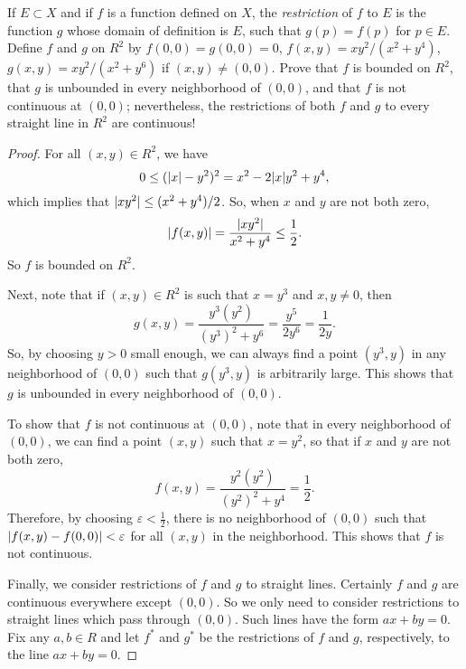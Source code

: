  If $E\subset X$ and if $f$ is a function defined on $X$,
the {\em restriction} of $f$ to $E$ is the function $g$ whose domain
of definition is $E$, such that $g(p) = f(p)$ for $p\in E$. Define $f$
and $g$ on $R^2$ by $f(0,0) = g(0,0) = 0$,
$f(x,y) = xy^2/(x^2 + y^4)$, $g(x,y) = xy^2/(x^2 + y^6)$ if
$(x,y)\neq(0,0)$. Prove that $f$ is bounded on $R^2$, that $g$ is
unbounded in every neighborhood of $(0,0)$, and that $f$ is not
continuous at $(0,0)$; nevertheless, the restrictions of both $f$ and
$g$ to every straight line in $R^2$ are continuous!
\begin{proof}
  For all $(x,y)\in R^2$, we have
  \begin{equation*}
    0\leq(\lvert{x}\rvert-y^2)^2 = x^2 - 2\lvert{x}\rvert y^2 + y^4,
  \end{equation*}
  which implies that $\lvert{xy^2}\rvert\leq(x^2 + y^4)/2$. So, when $x$ and
  $y$ are not both zero,
  \begin{equation*}
    \lvert{f(x,y)}\rvert = \frac{\lvert{xy^2}\rvert}{x^2+y^4}
    \leq \frac12.
  \end{equation*}
  So $f$ is bounded on $R^2$.

  Next, note that if $(x,y)\in R^2$ is such that $x = y^3$ and
  $x,y\neq0$, then
  \begin{equation*}
    g(x,y) = \frac{y^3(y^2)}{(y^3)^2 + y^6}
    = \frac{y^5}{2y^6} = \frac1{2y}.
  \end{equation*}
  So, by choosing $y > 0$ small enough, we can always find a point
  $(y^3,y)$ in any neighborhood of $(0,0)$ such that $g(y^3,y)$ is
  arbitrarily large. This shows that $g$ is unbounded in every
  neighborhood of $(0,0)$.

  To show that $f$ is not continuous at $(0,0)$, note that in every
  neighborhood of $(0,0)$, we can find a point $(x,y)$ such that
  $x = y^2$, so that if $x$ and $y$ are not both zero,
  \begin{equation*}
    f(x,y) = \frac{y^2(y^2)}{(y^2)^2 + y^4} = \frac12.
  \end{equation*}
  Therefore, by choosing $\varepsilon < \frac12$, there is no
  neighborhood of $(0,0)$ such that
  $\lvert{f(x,y) - f(0,0)}\rvert < \varepsilon$ for all $(x,y)$ in the
  neighborhood. This shows that $f$ is not continuous.

  Finally, we consider restrictions of $f$ and $g$ to straight
  lines. Certainly $f$ and $g$ are continuous everywhere except
  $(0,0)$. So we only need to consider restrictions to straight lines
  which pass through $(0,0)$. Such lines have the form $ax + by =
  0$. Fix any $a,b\in R$ and let $f^*$ and $g^*$ be the restrictions
  of $f$ and $g$, respectively, to the line $ax + by = 0$.


\end{proof}
